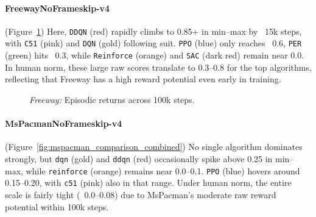 \paragraph{FreewayNoFrameskip-v4}
(Figure~\ref{fig:freeway_comparison_combined})
Here, \texttt{DDQN} (red) rapidly climbs to 0.85+ in min--max by ~15k steps, 
with \texttt{C51} (pink) and \texttt{DQN} (gold) following suit. 
\texttt{PPO} (blue) only reaches ~0.6, 
\texttt{PER} (green) hits ~0.3, while \texttt{Reinforce} (orange) and \texttt{SAC} (dark red) 
remain near 0.0. 
In human norm, these large raw scores translate to 0.3--0.8 for the top algorithms, 
reflecting that Freeway has a high reward potential even early in training.
\begin{figure} 
	\centering
	\quad
	\caption{\emph{Freeway:} Episodic returns across 100k steps.}
	\label{fig:freeway_comparison_combined}
\end{figure}

\paragraph{MsPacmanNoFrameskip-v4}
(Figure~\ref{fig:mspacman_comparison_combined})
No single algorithm dominates strongly, but \texttt{dqn} (gold) and \texttt{ddqn} (red) 
occasionally spike above 0.25 in min--max, while \texttt{reinforce} (orange) remains 
near 0.0--0.1. \texttt{PPO} (blue) hovers around 0.15--0.20, 
with \texttt{c51} (pink) also in that range. 
Under human norm, the entire scale is fairly tight (~0.0--0.08) 
due to MsPacman's moderate raw reward potential within 100k steps.

